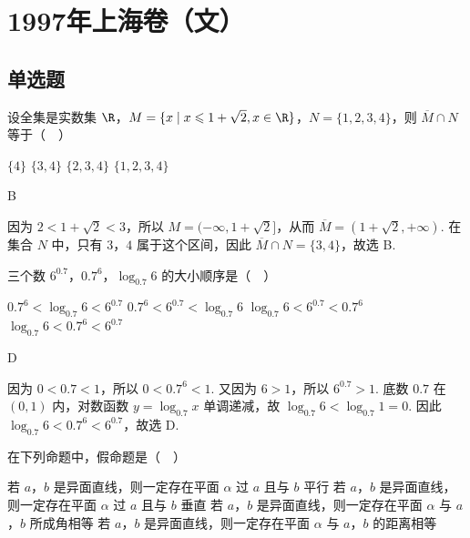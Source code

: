 \chapter{1997年上海卷（文）}
\section{单选题}

\begin{problem}
设全集是实数集 \(\R\)，\(M = \{x \mid x \leqslant 1 + \sqrt{2}, x \in \R\}\)，\(N = \{1, 2, 3, 4\}\)，则 \(\overline{M} \cap N\) 等于（\(\quad\)）

\choices
    {\(\{4\}\)}
    {\(\{3,4\}\)}
    {\(\{2,3,4\}\)}
    {\(\{1,2,3,4\}\)}
\end{problem}

\begin{answer}
B
\end{answer}

\begin{solution}
因为 \(2<1+\sqrt{2}<3\)，所以 \(M=(-\infty,1+\sqrt{2}]\)，从而 \(\overline{M}=(1+\sqrt{2},+\infty)\). 在集合 \(N\) 中，只有 \(3\)，\(4\) 属于这个区间，因此 \(\overline{M}\cap N=\{3,4\}\)，故选 B.
\end{solution}

\begin{problem}
三个数 \(6^{0.7}\)，\(0.7^{6}\)，\(\log_{0.7}6\) 的大小顺序是（\(\quad\)）

\choices
    {\(0.7^{6} < \log_{0.7}6 < 6^{0.7}\)}
    {\(0.7^{6} < 6^{0.7} < \log_{0.7}6\)}
    {\(\log_{0.7}6<6^{0.7}<0.7^{6}\)}
    {\(\log_{0.7}6<0.7^{6}<6^{0.7}\)}
\end{problem}

\begin{answer}
D
\end{answer}

\begin{solution}
因为 \(0<0.7<1\)，所以 \(0<0.7^6<1\). 又因为 \(6>1\)，所以 \(6^{0.7}>1\). 底数 \(0.7\) 在 \((0,1)\) 内，对数函数 \(y=\log_{0.7}x\) 单调递减，故 \(\log_{0.7}6<\log_{0.7}1=0\). 因此 \(\log_{0.7}6<0.7^6<6^{0.7}\)，故选 D.
\end{solution}

\begin{problem}
在下列命题中，假命题是（\(\quad\)）

\choices
    {若 \(a\)，\(b\) 是异面直线，则一定存在平面 \(\alpha\) 过 \(a\) 且与 \(b\) 平行}
    {若 \(a\)，\(b\) 是异面直线，则一定存在平面 \(\alpha\) 过 \(a\) 且与 \(b\) 垂直}
    {若 \(a\)，\(b\) 是异面直线，则一定存在平面 \(\alpha\) 与 \(a\)，\(b\) 所成角相等}
    {若 \(a\)，\(b\) 是异面直线，则一定存在平面 \(\alpha\) 与 \(a\)，\(b\) 的距离相等}
\end{problem}

